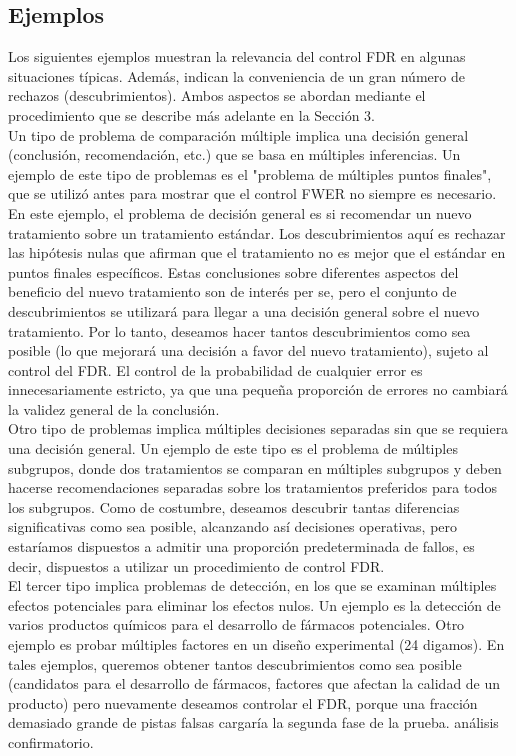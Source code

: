 \documentclass[11pt,letterpaper]{article}
\begin{document}
\subsection{Ejemplos}
Los siguientes ejemplos muestran la relevancia del control FDR en algunas situaciones típicas. Además, indican la conveniencia de un gran número de rechazos (descubrimientos). Ambos aspectos se abordan mediante el procedimiento que se describe más adelante en la Sección 3.\\
Un tipo de problema de comparación múltiple implica una decisión general (conclusión, recomendación, etc.) que se basa en múltiples inferencias. Un ejemplo de este tipo de problemas es el "problema de múltiples puntos finales", que se utilizó antes para mostrar que el control FWER no siempre es necesario. En este ejemplo, el problema de decisión general es si recomendar un nuevo tratamiento sobre un tratamiento estándar. Los descubrimientos aquí es rechazar las hipótesis nulas que afirman que el tratamiento no es mejor que el estándar en puntos finales específicos. Estas conclusiones sobre diferentes aspectos del beneficio del nuevo tratamiento son de interés per se, pero el conjunto de descubrimientos se utilizará para llegar a una decisión general sobre el nuevo tratamiento. Por lo tanto, deseamos hacer tantos descubrimientos como sea posible (lo que mejorará una decisión a favor del nuevo tratamiento), sujeto al control del FDR. El control de la probabilidad de cualquier error es innecesariamente estricto, ya que una pequeña proporción de errores no cambiará la validez general de la conclusión.\\
Otro tipo de problemas implica múltiples decisiones separadas sin que se requiera una decisión general. Un ejemplo de este tipo es el problema de múltiples subgrupos, donde dos tratamientos se comparan en múltiples subgrupos y deben hacerse recomendaciones separadas sobre los tratamientos preferidos para todos los subgrupos. Como de costumbre, deseamos descubrir tantas diferencias significativas como sea posible, alcanzando así decisiones operativas, pero estaríamos dispuestos a admitir una proporción predeterminada de fallos, es decir, dispuestos a utilizar un procedimiento de control FDR.\\
El tercer tipo implica problemas de detección, en los que se examinan múltiples efectos potenciales para eliminar los efectos nulos. Un ejemplo es la detección de varios productos químicos para el desarrollo de fármacos potenciales. Otro ejemplo es probar múltiples factores en un diseño experimental (24 digamos). En tales ejemplos, queremos obtener tantos descubrimientos como sea posible (candidatos para el desarrollo de fármacos, factores que afectan la calidad de un producto) pero nuevamente deseamos controlar el FDR, porque una fracción demasiado grande de pistas falsas cargaría la segunda fase de la prueba. análisis confirmatorio.
\end{document}
